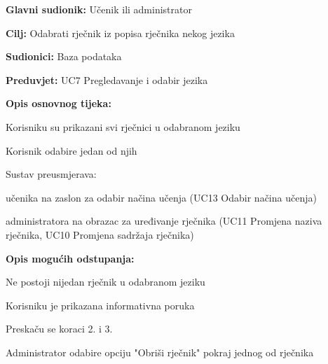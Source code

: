 \noindent {}
\begin{packed_item}

	\item \textbf{Glavni sudionik: } Učenik ili administrator
	\item \textbf{Cilj: } Odabrati rječnik iz popisa rječnika nekog jezika
	\item \textbf{Sudionici: } Baza podataka
	\item \textbf{Preduvjet: } UC7 Pregledavanje i odabir jezika
	\item  \textbf{Opis osnovnog tijeka:}
	
	\item[] \begin{packed_enum}
		
		\item Korisniku su prikazani svi rječnici u odabranom jeziku
		\item Korisnik odabire jedan od njih
		\item Sustav preusmjerava:
		\item[] \begin{packed_item}
		
			\item učenika na zaslon za odabir načina učenja (UC13 Odabir načina učenja)
			\item administratora na obrazac za uređivanje rječnika (UC11 Promjena naziva rječnika, UC10 Promjena sadržaja rječnika)
			
		\end{packed_item}

	\end{packed_enum}

	\item  \textbf{Opis mogućih odstupanja:}
	
	\item[] \begin{packed_item}

		\item[1.a] Ne postoji nijedan rječnik u odabranom jeziku
		\item[] \begin{packed_enum}
			
			\item Korisniku je prikazana informativna poruka
			\item Preskaču se koraci 2. i 3.
			
		\end{packed_enum}
		\item[2.a] Administrator odabire opciju "Obriši rječnik" pokraj jednog od rječnika
		\item[] \begin{packed_enum}
			

\end{packed_enum}
\end{packed_item}
\end{packed_item}
